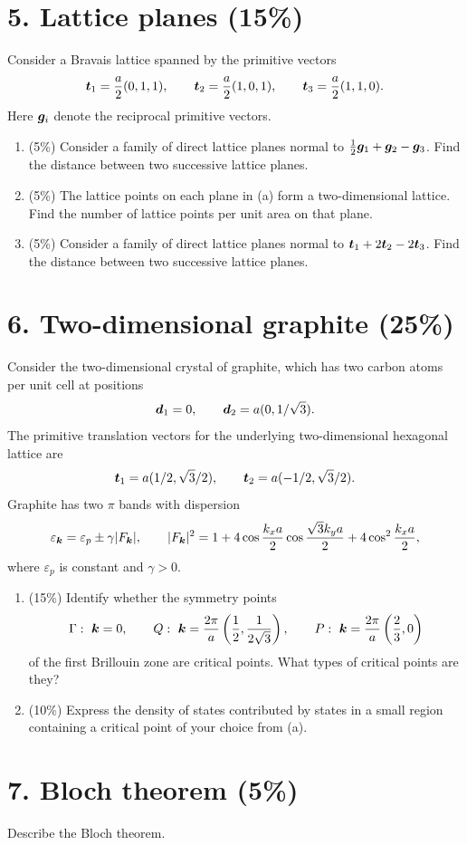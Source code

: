 \section*{5. Lattice planes (15\%)}
Consider a Bravais lattice spanned by the primitive vectors
\[
\boldsymbol{t}_1=\frac a2(0,1,1),\qquad
\boldsymbol{t}_2=\frac a2(1,0,1),\qquad
\boldsymbol{t}_3=\frac a2(1,1,0).
\]
Here $\boldsymbol{g}_i$ denote the reciprocal primitive vectors.
\begin{enumerate}[label=(\alph*)]
\item (5\%) Consider a family of direct lattice planes normal to $\tfrac12\boldsymbol{g}_1+\boldsymbol{g}_2-\boldsymbol{g}_3$. Find the distance between two successive lattice planes.
\item (5\%) The lattice points on each plane in (a) form a two-dimensional lattice. Find the number of lattice points per unit area on that plane.
\item (5\%) Consider a family of direct lattice planes normal to $\boldsymbol{t}_1+2\boldsymbol{t}_2-2\boldsymbol{t}_3$. Find the distance between two successive lattice planes.
\end{enumerate}

\section*{6. Two-dimensional graphite (25\%)}
Consider the two-dimensional crystal of graphite, which has two carbon atoms per unit cell at positions
\[
\boldsymbol{d}_1=0,\qquad \boldsymbol{d}_2=a(0,1/\sqrt3).
\]
The primitive translation vectors for the underlying two-dimensional hexagonal lattice are
\[
\boldsymbol{t}_1=a(1/2,\sqrt3/2),\qquad
\boldsymbol{t}_2=a(-1/2,\sqrt3/2).
\]
Graphite has two $\pi$ bands with dispersion
\[
\varepsilon_{\boldsymbol{k}}=\varepsilon_p\pm\gamma|F_{\boldsymbol{k}}|,
\qquad
|F_{\boldsymbol{k}}|^2=1+4\cos\frac{k_xa}{2}\cos\frac{\sqrt3k_ya}{2}
+4\cos^2\frac{k_xa}{2},
\]
where $\varepsilon_p$ is constant and $\gamma>0$.
\begin{enumerate}[label=(\alph*)]
\item (15\%) Identify whether the symmetry points
\[
\Gamma:\ \boldsymbol{k}=0,\qquad
Q:\ \boldsymbol{k}=\frac{2\pi}{a}\left(\frac12,\frac1{2\sqrt3}\right),\qquad
P:\ \boldsymbol{k}=\frac{2\pi}{a}\left(\frac23,0\right)
\]
of the first Brillouin zone are critical points. What types of critical points are they?
\item (10\%) Express the density of states contributed by states in a small region containing a critical point of your choice from (a).
\end{enumerate}

\section*{7. Bloch theorem (5\%)}
Describe the Bloch theorem.
